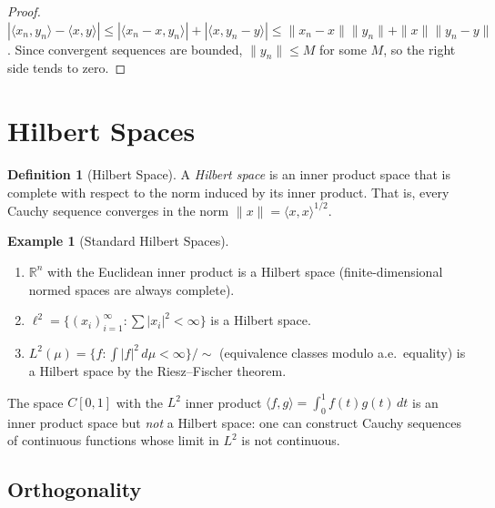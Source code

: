 \documentclass[11pt,a4paper]{article}
\theoremstyle{definition}
\newtheorem{definition}{Definition}[section]
\newtheorem{example}{Example}[section]
\theoremstyle{plain}
\theoremstyle{remark}
\newcommand{\R}{\mathbb{R}}
\begin{document}
\begin{proof}
$|\langle x_n, y_n \rangle - \langle x, y \rangle|
\leq |\langle x_n - x, y_n \rangle| + |\langle x, y_n - y \rangle|
\leq \|x_n - x\| \|y_n\| + \|x\| \|y_n - y\|$.
Since convergent sequences are bounded, $\|y_n\| \leq M$ for some $M$,
so the right side tends to zero.
\end{proof}


\section{Hilbert Spaces}\label{sec:hilbert}

\begin{definition}[Hilbert Space]\label{def:hilbert-space}
A \emph{Hilbert space} is an inner product space that is complete with respect
to the norm induced by its inner product. That is, every Cauchy sequence
converges in the norm $\|x\| = \langle x, x \rangle^{1/2}$.
\end{definition}

\begin{example}[Standard Hilbert Spaces]\label{ex:hilbert-spaces}
\begin{enumerate}[label=(\alph*)]
    \item $\R^n$ with the Euclidean inner product is a Hilbert space (finite-dimensional
          normed spaces are always complete).
    \item $\ell^2 = \{(x_i)_{i=1}^\infty : \sum |x_i|^2 < \infty\}$ is a Hilbert space.
    \item $L^2(\mu) = \{f : \int |f|^2 \, d\mu < \infty\} / {\sim}$ (equivalence
          classes modulo a.e.\ equality) is a Hilbert space by the Riesz--Fischer theorem.
\end{enumerate}
\end{example}

\begin{warning}
The space $C[0,1]$ with the $L^2$ inner product
$\langle f, g \rangle = \int_0^1 f(t)g(t)\, dt$ is an inner product space
but \emph{not} a Hilbert space: one can construct Cauchy sequences of
continuous functions whose limit in $L^2$ is not continuous.
\end{warning}

\subsection{Orthogonality}
\end{document}
